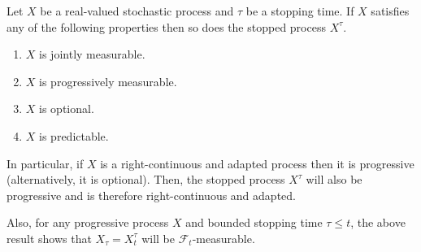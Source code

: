 \documentclass[12pt]{article}
\begin{document}
Let $X$ be a real-valued stochastic process and $\tau$ be a stopping time. If $X$ satisfies any of the following properties then so does the stopped process $X^\tau$.
\begin{enumerate}
\item $X$ is jointly measurable.
\item $X$ is progressively measurable.
\item $X$ is optional.
\item $X$ is predictable.
\end{enumerate}

In particular, if $X$ is a right-continuous and adapted process then it is progressive (alternatively, it is optional). Then, the stopped process $X^\tau$ will also be progressive and is therefore right-continuous and adapted.

Also, for any progressive process $X$ and bounded stopping time $\tau\le t$, the above result shows that $X_\tau=X^\tau_t$ will be $\mathcal{F}_t$-measurable.

\end{document}
